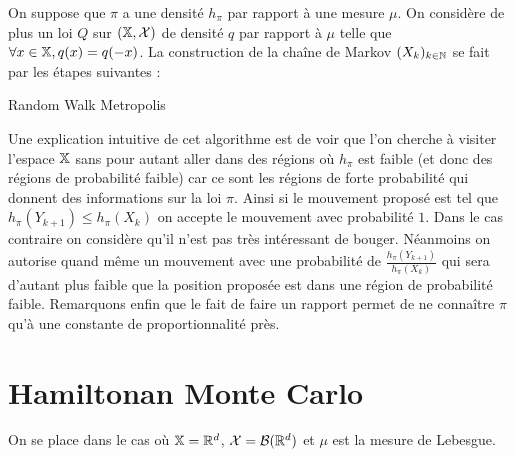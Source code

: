 \documentclass[10pt,a4paper]{article}
\begin{document}
On suppose que $\pi$ a une densité $h_\pi$ par rapport à une mesure $\mu$. On considère de plus un loi $Q$ sur $(\mathbb{X}, \mathcal{X})$ de densité $q$ par rapport à $\mu$ telle que $\forall x \in \mathbb{X}, q(x) = q(-x) $. La construction de la chaîne de Markov $(X_k)_{k \in \mathbb{N}}$ se fait par les étapes suivantes :

\begin{center}
\begin{algorithm}[H]
 \caption{Random Walk Metropolis}
\end{algorithm}
\end{center}

Une explication intuitive de cet algorithme est de voir que l'on cherche à visiter l'espace $\mathbb{X}$ sans pour autant aller dans des régions où $h_\pi$ est faible (et donc des régions de probabilité faible) car ce sont les régions de forte probabilité qui donnent des informations sur la loi $\pi$. Ainsi si le mouvement proposé est tel que $h_\pi(Y_{k+1}) \leq h_\pi(X_k)$ on accepte le mouvement avec probabilité $1$. Dans le cas contraire on considère qu'il n'est pas très intéressant de bouger. Néanmoins on autorise quand même un mouvement avec une probabilité de $\frac{h_\pi(Y_{k+1})}{h_\pi(X_k)}$ qui sera d'autant plus faible que la position proposée est dans une région de probabilité faible. Remarquons enfin que le fait de faire un rapport permet de ne connaître $\pi$ qu'à une constante de proportionnalité près. 

\section{Hamiltonan Monte Carlo}
On se place dans le cas où $\mathbb{X} = \mathbb{R}^d$, $\mathcal{X} = \mathcal{B}(\mathbb{R}^d)$ et $\mu$ est la mesure de Lebesgue. 
\end{document}
